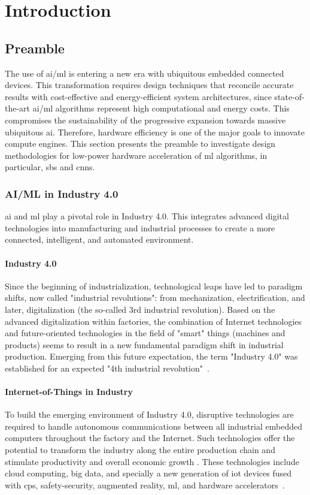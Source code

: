 \chapter{Introduction}\label{chap.intro}
\minitoc
\section{Preamble}
The use of \gls{ai}/\gls{ml} is entering a new era with ubiquitous embedded connected devices. This transformation requires design techniques that reconcile accurate results with cost-effective and energy-efficient system architectures, since state-of-the-art \gls{ai}/\gls{ml} algorithms represent high computational and energy costs. This compromises the sustainability of the progressive expansion towards massive ubiquitous \gls{ai}. Therefore, hardware efficiency is one of the major goals to innovate compute engines. This section presents the preamble to investigate design methodologies for low-power hardware acceleration of \gls{ml} algorithms, in particular, \gls{sbs} and \glspl{cnn}.

\subsection{AI/ML in Industry 4.0}
\gls{ai} and \gls{ml} play a pivotal role in Industry 4.0. This integrates advanced digital technologies into manufacturing and industrial processes to create a more connected, intelligent, and automated environment.
\subsubsection{Industry 4.0}
Since the beginning of industrialization, technological leaps have led to paradigm shifts, now called "industrial revolutions": from mechanization, electrification, and later, digitalization (the so-called 3rd industrial revolution). Based on the advanced digitalization within factories, the combination of Internet technologies and future-oriented technologies in the field of "smart" things (machines and products) seems to result in a new fundamental paradigm shift in industrial production. Emerging from this future expectation, the term "Industry 4.0" was established for an expected "4th industrial revolution"~\cite{lasi2014industry}.


\subsubsection{Internet-of-Things in Industry}
To build the emerging environment of Industry 4.0, disruptive technologies are required to handle autonomous communications between all industrial embedded computers throughout the factory and the Internet. Such technologies offer the potential to transform the industry along the entire production chain and stimulate productivity and overall economic growth \cite{espinoza2020estimating}. These technologies include cloud computing, big data, and specially a new generation of \gls{iot} devices fused with \gls{cps}, safety-security, augmented reality, \gls{ml}, and hardware accelerators~\cite{alcacer2019scanning}.

